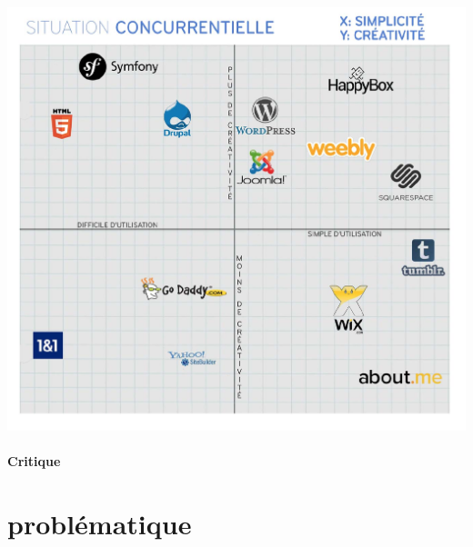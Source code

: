 \documentclass[11pt, a4paper ]{article}
\let\stdsection\section
\renewcommand\section{\newpage\stdsection}
\begin{document}
\begin{spacing}{1.5}
\begin{center}
	\includegraphics[width=\textwidth]{images/media/concurenceHBCMS}
\end{center}
		
		\paragraph{Critique}


		\section{problématique} %




\end{spacing}
\end{document}
